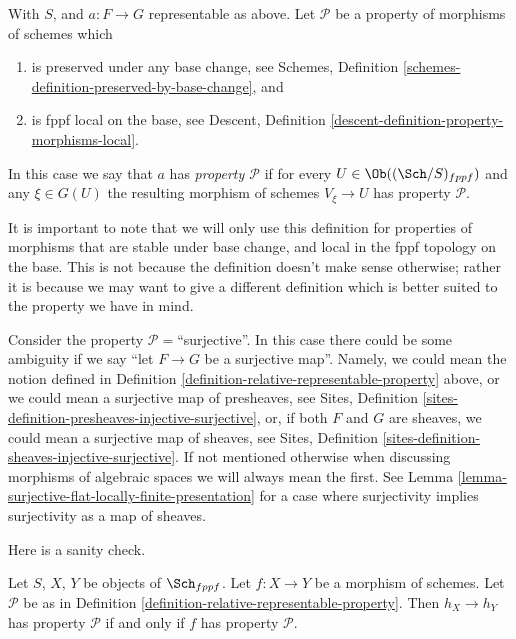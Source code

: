 \begin{definition}
\label{definition-relative-representable-property}
With $S$, and $a : F \to G$ representable as above.
Let $\mathcal{P}$ be a property of morphisms of schemes which
\begin{enumerate}
\item is preserved under any base change,
see Schemes, Definition \ref{schemes-definition-preserved-by-base-change},
and
\item is fppf local on the base, see
Descent, Definition \ref{descent-definition-property-morphisms-local}.
\end{enumerate}
In this case we say that $a$ has {\it property $\mathcal{P}$} if for every
$U \in \Ob((\Sch/S)_{fppf})$ and
any $\xi \in G(U)$ the resulting morphism of schemes
$V_\xi \to U$ has property $\mathcal{P}$.
\end{definition}

\noindent
It is important to note that we will only use this definition for
properties of morphisms that are stable under base change, and
local in the fppf topology on the base. This is
not because the definition doesn't make sense otherwise; rather it
is because we may want to give a different definition which is
better suited to the property we have in mind.

\begin{remark}
\label{remark-warning}
Consider the property $\mathcal{P}=$``surjective''.
In this case there could be some ambiguity if we say
``let $F \to G$ be a surjective map''.
Namely, we could mean the notion defined
in Definition \ref{definition-relative-representable-property}
above, or we could mean a surjective map of presheaves, see
Sites, Definition \ref{sites-definition-presheaves-injective-surjective},
or, if both $F$ and $G$ are sheaves,
we could mean a surjective map of sheaves, see
Sites, Definition \ref{sites-definition-sheaves-injective-surjective}.
If not mentioned otherwise when discussing morphisms of algebraic spaces
we will always mean the first. See
Lemma \ref{lemma-surjective-flat-locally-finite-presentation}
for a case where surjectivity implies surjectivity as a map of sheaves.
\end{remark}

\noindent
Here is a sanity check.

\begin{lemma}
\label{lemma-morphism-schemes-gives-representable-transformation-property}
Let $S$, $X$, $Y$ be objects of $\Sch_{fppf}$.
Let $f : X \to Y$ be a morphism of schemes.
Let $\mathcal{P}$ be as in
Definition \ref{definition-relative-representable-property}.
Then $h_X \longrightarrow h_Y$ has property $\mathcal{P}$ if
and only if $f$ has property $\mathcal{P}$.
\end{lemma}

